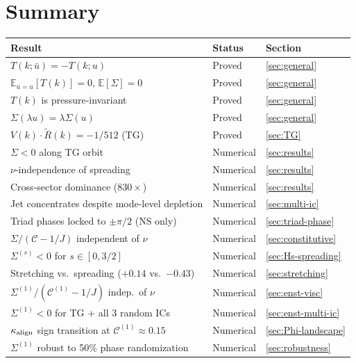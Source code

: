 \documentclass[11pt]{article}
\theoremstyle{definition}
\newcommand{\E}{\mathbb{E}}
\newcommand{\cC}{\mathcal{C}}
\begin{document}
\section{Summary}

\begin{center}
\renewcommand{\arraystretch}{1.2}
\begin{tabular}{@{}lll@{}}
\toprule
\textbf{Result} & \textbf{Status} & \textbf{Section} \\
\midrule
$T(k;\bar u) = -T(k;u)$
  & Proved & \ref{sec:general} \\
$\E_{\bar u=u}[T(k)]=0$, $\E[\Sigma]=0$
  & Proved & \ref{sec:general} \\
$T(k)$ is pressure-invariant
  & Proved & \ref{sec:general} \\
$\Sigma(\lambda u)=\lambda\Sigma(u)$
  & Proved & \ref{sec:general} \\
$V(k)\cdot\widetilde R(k)=-1/512$ (TG)
  & Proved & \ref{sec:TG} \\
$\Sigma<0$ along TG orbit
  & Numerical & \ref{sec:results} \\
$\nu$-independence of spreading
  & Numerical & \ref{sec:results} \\
Cross-sector dominance ($830\times$)
  & Numerical & \ref{sec:results} \\
Jet concentrates despite mode-level depletion
  & Numerical & \ref{sec:multi-ic} \\
Triad phases locked to $\pm\pi/2$ (NS only)
  & Numerical & \ref{sec:triad-phase} \\
$\Sigma/(\cC-1/J)$ independent of $\nu$
  & Numerical & \ref{sec:constitutive} \\
$\Sigma^{(s)}<0$ for $s\in[0,3/2]$
  & Numerical & \ref{sec:Hs-spreading} \\
Stretching vs.\ spreading ($+0.14$ vs.\ $-0.43$)
  & Numerical & \ref{sec:stretching} \\
$\Sigma^{(1)}/(\cC^{(1)}-1/J)$ indep.\ of $\nu$
  & Numerical & \ref{sec:enst-visc} \\
$\Sigma^{(1)}<0$ for TG + all 3 random ICs
  & Numerical & \ref{sec:enst-multi-ic} \\
$\kappa_{\rm align}$ sign transition at $\cC^{(1)}\approx 0.15$
  & Numerical & \ref{sec:Phi-landscape} \\
$\Sigma^{(1)}$ robust to 50\% phase randomization
  & Numerical & \ref{sec:robustness} \\

\end{tabular}
\end{center}
\end{document}
